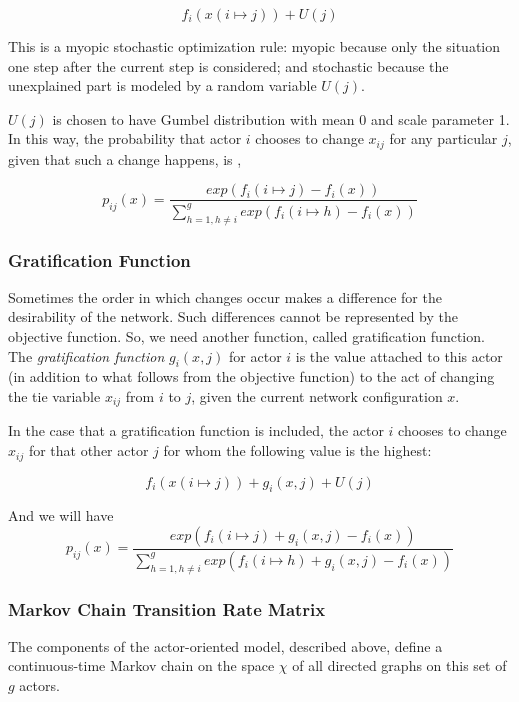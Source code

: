 \documentclass[11pt]{report}
\begin{document}
\begin{equation}
f_i(x(i \mapsto j)) + U(j)
\end{equation} 

This is a myopic stochastic optimization rule: myopic because only the situation one step after the current step is considered; and stochastic because the unexplained part is modeled by a random variable $U(j)$. 

$U(j)$ is chosen to have Gumbel distribution with mean 0 and scale parameter 1. In this way, the probability that actor $i$ chooses to change $x_{ij}$ for any particular $j$, given that such a change happens, is \cite{Snijders2004},

\begin{equation}
p_{ij}(x) = \frac{exp(f_i(i \mapsto j) - f_i(x))}{\sum_{h=1, h \neq i}^{g} exp(f_i(i \mapsto h) - f_i(x))}
\end{equation}

\subsubsection{Gratification Function}
Sometimes the order in which changes occur makes a difference for the desirability of the network. Such differences cannot be represented by the objective function. So, we need another function, called gratification function. \\

The \textit{gratification function} $g_i(x,j)$ for actor $i$ is the value attached to this actor (in addition to what follows from the objective function) to the act of changing the tie variable $x_{ij}$ from $i$ to $j$, given the current network configuration $x$. 

In the case that a gratification function is included, the actor $i$ chooses to change $x_{ij}$ for that other actor $j$ for whom the following value \cite{Snijders2004} is the highest:

\begin{equation}
f_i(x(i \mapsto j)) + g_i(x, j) + U(j)
\end{equation} 

And we will have 
\begin{equation}
\label{ObjectiveFunctionWithGratification}
p_{ij}(x) = \frac{exp(f_i(i \mapsto j) + g_i(x, j) - f_i(x))}{\sum_{h=1, h \neq i}^{g} exp(f_i(i \mapsto h) + g_i(x, j) - f_i(x))}
\end{equation}

\subsubsection{Markov Chain Transition Rate Matrix}
The components of the actor-oriented model, described above, define a continuous-time Markov chain on the space $\chi$ of all directed graphs on this set of $g$ actors. 
\end{document}
